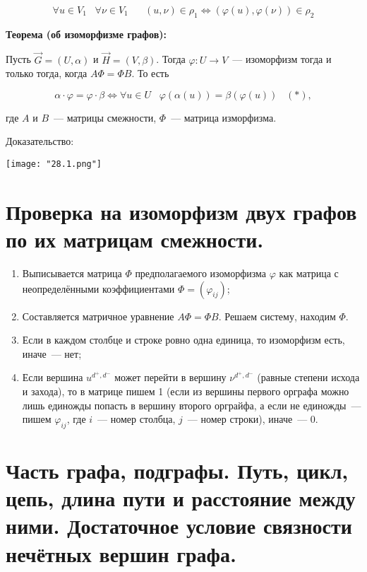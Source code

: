     \[
        \forall u \in V_1 \;\;\; \forall \nu \in V_1 \;\;\;\;\;\;
        (u, \nu) \in \rho_1 \Leftrightarrow (\varphi(u), \varphi(\nu)) \in \rho_2
    \]
    \bigskip

\textbf{Теорема (об изоморфизме графов):}
    \smallskip
    
    Пусть $\overrightarrow{G} = (U, \alpha)$ и $\overrightarrow{H} = (V, \beta)$.
    Тогда $\varphi: U \to V$~--- изоморфизм тогда и только тогда, когда
    $A \Phi = \Phi B$. То есть

    \[
        \alpha \cdot \varphi = \varphi \cdot \beta \Leftrightarrow
        \forall u \in U \;\;\; \varphi(\alpha(u)) = \beta (\varphi(u)) \;\;\; (*),  
    \]

    где $A$ и $B$~--- матрицы смежности, $\Phi$~--- матрица изморфизма.
    \bigskip

    Доказательство:
    \bigskip

    \begin{center}
        \texttt{[image: "28.1.png"]}
    \end{center}

\section{Проверка на изоморфизм двух графов по их матрицам смежности.}

\begin{enumerate}
    \item{Выписывается матрица $\Phi$ предполагаемого изоморфизма $\varphi$
    как матрица с неопределёнными коэффициентами $\Phi = (\varphi_{ij})$;}
    \item{Составляется матричное уравнение $A \Phi = \Phi B$. Решаем систему,
    находим $\Phi$.}
    \item{Если в каждом столбце и строке ровно одна единица, то изоморфизм есть,
    иначе~--- нет;}
    \item{Если вершина $u^{d^{+}, d^{-}}$ может перейти в вершину $\nu^{d^{+}, d^{-}}$
    (равные степени исхода и захода), то в матрице пишем 1 (если из вершины
    первого орграфа можно лишь единожды попасть в вершину второго орграйфа,
    а если не единожды~--- пишем $\varphi_{ij}$, где $i$~--- номер столбца,
    $j$~--- номер строки), иначе~--- 0.}
\end{enumerate}

\section{Часть графа, подграфы. Путь, цикл, цепь, длина пути и расстояние между ними.
Достаточное условие связности нечётных вершин графа.}

